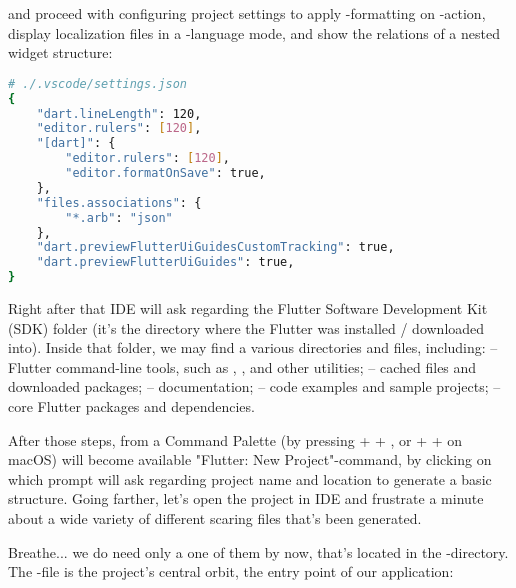 \noindent and proceed with configuring project settings to apply -formatting on -action, display 
localization files in a -language mode, and show the relations of a nested widget structure:

\begin{lstlisting}[language=bash]
# ./.vscode/settings.json 
{
    "dart.lineLength": 120,
    "editor.rulers": [120],
    "[dart]": {
        "editor.rulers": [120],
        "editor.formatOnSave": true,
    },
    "files.associations": {
        "*.arb": "json"
    },
    "dart.previewFlutterUiGuidesCustomTracking": true,
    "dart.previewFlutterUiGuides": true,
}
\end{lstlisting}

\noindent Right after that IDE will ask regarding the Flutter Software Development Kit (SDK) folder (it's the directory 
where the Flutter was installed / downloaded into). Inside that folder, we may find a various directories and files, 
including:
 -- Flutter command-line tools, such as , , and other utilities;
 -- cached files and downloaded packages;
 -- documentation;
 -- code examples and sample projects;
 -- core Flutter packages and dependencies.

After those steps, from a Command Palette (by pressing  +  + , or  +  + 
 on macOS) will become available "Flutter: New Project"-command, by clicking on which prompt will ask regarding
project name and location to generate a basic structure. Going farther, let's open the project in IDE and frustrate a 
minute about a wide variety of different scaring files that's been generated. 

\newpage
\noindent Breathe... we do need only a one of them by now, that's located in the -directory. The 
-file is the project's central orbit, the entry point of our application:

